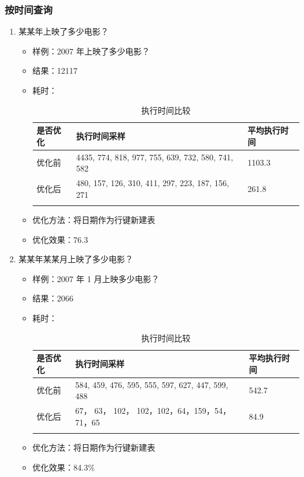 \documentclass{ctexrep}
\begin{document}
	\subsubsection{按时间查询}
	    \begin{enumerate}
	        \item 某某年上映了多少电影？
    	        \begin{itemize}
    	            \item 样例：2007 年上映了多少电影？
    	            \item 结果：12117
    	            \item 耗时：
						\begin{longtable}{l|p{5cm}|l}
							\hline
							是否优化 & 执行时间采样 & 平均执行时间\\
							\hline
							\hline
							优化前 &4435, 774, 818, 977, 755, 639, 732, 580, 741, 582 & 1103.3\\
							优化后 &480, 157, 126, 310, 411, 297, 223, 187, 156, 271 & 261.8\\
							\hline
							\caption{执行时间比较}
						\end{longtable}
					\item 优化方法：将日期作为行键新建表
					\item 优化效果：76.3%
    	        \end{itemize}
    	    \item 某某年某某月上映了多少电影？
    	        \begin{itemize}
    	            \item 样例：2007 年 1 月上映多少电影？
    	            \item 结果：2066
    	            \item 耗时：
    	                \begin{longtable}{l|p{5cm}|l}
    	                    \hline
    	                    是否优化 & 执行时间采样 & 平均执行时间\\
    	                    \hline
    	                    \hline
    	                    优化前 &584, 459, 476, 595, 555, 597, 627, 447, 599, 488 & 542.7\\
    	                    优化后 &67， 63， 102， 102，102，64，159，54，71，65 & 84.9\\
    	                    \hline
    	                    \caption{执行时间比较}
    	                \end{longtable}
    	            \item 优化方法：将日期作为行键新建表
    	            \item 优化效果：84.3\%

\end{itemize}
\end{enumerate}
\end{document}
